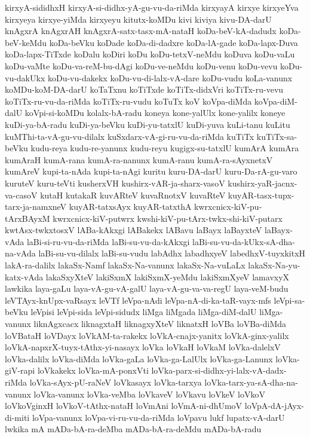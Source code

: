 {kirxyA-sididhxH
kirxyA-si-didhx-yA-gu-vu-da-riMda
kirxyayA
kirxye
kirxyeYva
kirxyeya
kirxye-yiMda
kirxyeyu
kitutx-koMDu
kivi
kiviya
kivu-DA-darU
knAgxrA
knAgxrAH
knAgxrA-satx-tasx-mA-nataH
koDa-beV-kA-dadudx
koDa-beV-keMdu
koDa-beVku
koDade
koDa-di-dadxre
koDa-lA-gade
koDa-lapx-Duva
koDa-lapx-TiTxde
koDalu
koDiri
koDu
koDu-tetxV-neMdu
koDuva
koDu-vaLu
koDu-vaMte
koDu-va-reM-bu-dAgi
koDu-ve-neMdu
koDu-venu
koDu-vevu
koDu-vu-dakUkx
koDu-vu-dakekx
koDu-vu-di-lalx-vA-dare
koDu-vudu
koLa-vanunx
koMDu-koM-DA-darU
koTaTxnu
koTiTxde
koTiTx-didxVri
koTiTx-ru-vevu
koTiTx-ru-vu-da-riMda
koTiTx-ru-vudu
koTuTx
koV
koVpa-diMda
koVpa-diM-dalU
koVpi-si-koMDu
kolalx-bA-radu
koneya
kone-yalUlx
kone-yalilx
koneye
kuDi-ya-bA-radu
kuDi-ya-beVku
kuDi-yu-tatxlU
kuDi-yuva
kuLi-tanu
kuLitu
kuMThi-ta-vA-gu-vu-dilalx
kuSxdarx-vA-gi-ru-vu-da-riMda
kuTiTx
kuTiTx-sa-beVku
kudu-reya
kudu-re-yanunx
kudu-reyu
kugigx-su-tatxlU
kumArA
kumAra
kumAraH
kumA-rana
kumA-ra-nanunx
kumA-ranu
kumA-ra-sAyxnetxV
kumAreV
kupi-ta-nAda
kupi-ta-nAgi
kuritu
kuru-DA-darU
kuru-Da-rA-gu-varo
kuruteV
kuru-teVti
kusherxVH
kushirx-vAR-ja-sharx-vasoV
kushirx-yaR-jacnx-va-casoV
kutaH
kutakaR
kuvARteV
kuvaRnotxV
kuvaRteV
kuyAR-tasx-tupx-tarx-ja-namxneV
kuyAR-tatxsAyx
kuyAR-tatxthA
kwrxcnicx-kiV-pu-tArxBAyxM
kwrxcnicx-kiV-putwrx
kwshi-kiV-pu-tArx-twkx-shi-kiV-putarx
kwtAsx-twkxtosxV
lABa-kAkxgi
lABakekx
lABavu
laBayx
laBayxteV
laBayx-vAda
laBi-si-ru-vu-da-riMda
laBi-su-vu-da-kAkxgi
laBi-su-vu-da-kUkx-sA-dha-na-vAda
laBi-su-vu-dilalx
laBi-su-vudu
labAdhx
labadhxyeV
labedhxV-tuyxkitxH
lakA-ra-dalilx
lakaSx-Namf
lakaSx-Na-vanunx
lakaSx-Na-vuLaLx
lakaSx-Na-yu-katx-vAda
lakaSxyXteV
lakiSxmX
lakiSxmX-yeMdu
lakiSxmXyeV
lamavxyX
lawkika
laya-gaLu
laya-vA-gu-vA-galU
laya-vA-gu-va-va-regU
laya-veM-budu
leVTAyx-knUpx-vaRsayx
leVTf
leVpa-nAdi
leVpa-nA-di-ka-taR-vayx-mfs
leVpi-sa-beVku
leVpisi
leVpi-sida
leVpi-sidudx
liMga
liMgada
liMga-diM-dalU
liMga-vanunx
liknAgxcacx
liknagxtaH
liknagxyXteV
liknatxH
loVBa
loVBa-diMda
loVBataH
loVDayx
loVkAM-ta-rakekx
loVkA-cnajx-yanitx
loVkA-ginx-yalilx
loVkA-napxrX-tuyx-tAthx-yi-nasayx
loVka
loVkaH
loVkaM
loVka-dalelxV
loVka-dalilx
loVka-diMda
loVka-gaLa
loVka-ga-LalUlx
loVka-ga-Lanunx
loVka-giV-rapi
loVkakekx
loVka-mA-ponxVti
loVka-parx-si-didhx-yi-lalx-vA-dadx-riMda
loVka-sAyx-pU-raNeV
loVkasayx
loVka-tarxya
loVka-tarx-ya-sA-dha-na-vanunx
loVka-vanunx
loVka-veMba
loVkaveV
loVkavu
loVkeV
loVkoV
loVkoVginxH
loVkoV-tAthx-nataH
loVmAni
loVmA-ni-dhUmoV
loVpA-dA-jAyx-di-miti
loVpa-vanunx
loVpa-vi-ru-vu-da-riMda
loVpavu
lukf
lupatx-vA-darU
lwkika
mA
mADa-bA-ra-deMba
mADa-bA-ra-deMdu
mADa-bA-radu
}
